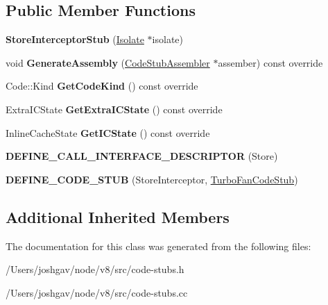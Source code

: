\subsection*{Public Member Functions}
\begin{DoxyCompactItemize}
\item 
{\bfseries Store\+Interceptor\+Stub} (\hyperlink{classv8_1_1internal_1_1_isolate}{Isolate} $\ast$isolate)\hypertarget{classv8_1_1internal_1_1_store_interceptor_stub_a30232ec1c8179667d06bca10ec6e38e6}{}\label{classv8_1_1internal_1_1_store_interceptor_stub_a30232ec1c8179667d06bca10ec6e38e6}

\item 
void {\bfseries Generate\+Assembly} (\hyperlink{classv8_1_1internal_1_1_code_stub_assembler}{Code\+Stub\+Assembler} $\ast$assember) const  override\hypertarget{classv8_1_1internal_1_1_store_interceptor_stub_a1ca7d83e7982122a236da19efa4c8324}{}\label{classv8_1_1internal_1_1_store_interceptor_stub_a1ca7d83e7982122a236da19efa4c8324}

\item 
Code\+::\+Kind {\bfseries Get\+Code\+Kind} () const  override\hypertarget{classv8_1_1internal_1_1_store_interceptor_stub_a625474bc6f95b0325d264dadd0e7e73a}{}\label{classv8_1_1internal_1_1_store_interceptor_stub_a625474bc6f95b0325d264dadd0e7e73a}

\item 
Extra\+I\+C\+State {\bfseries Get\+Extra\+I\+C\+State} () const  override\hypertarget{classv8_1_1internal_1_1_store_interceptor_stub_a4661a6b886a1020edaf3687632ae53e1}{}\label{classv8_1_1internal_1_1_store_interceptor_stub_a4661a6b886a1020edaf3687632ae53e1}

\item 
Inline\+Cache\+State {\bfseries Get\+I\+C\+State} () const  override\hypertarget{classv8_1_1internal_1_1_store_interceptor_stub_a2192a380e84da378575f87131162f47f}{}\label{classv8_1_1internal_1_1_store_interceptor_stub_a2192a380e84da378575f87131162f47f}

\item 
{\bfseries D\+E\+F\+I\+N\+E\+\_\+\+C\+A\+L\+L\+\_\+\+I\+N\+T\+E\+R\+F\+A\+C\+E\+\_\+\+D\+E\+S\+C\+R\+I\+P\+T\+OR} (Store)\hypertarget{classv8_1_1internal_1_1_store_interceptor_stub_afe129c2c92e43116250113d4b4037633}{}\label{classv8_1_1internal_1_1_store_interceptor_stub_afe129c2c92e43116250113d4b4037633}

\item 
{\bfseries D\+E\+F\+I\+N\+E\+\_\+\+C\+O\+D\+E\+\_\+\+S\+T\+UB} (Store\+Interceptor, \hyperlink{classv8_1_1internal_1_1_turbo_fan_code_stub}{Turbo\+Fan\+Code\+Stub})\hypertarget{classv8_1_1internal_1_1_store_interceptor_stub_a3e99e71972dd797ef019283062047cdd}{}\label{classv8_1_1internal_1_1_store_interceptor_stub_a3e99e71972dd797ef019283062047cdd}

\end{DoxyCompactItemize}
\subsection*{Additional Inherited Members}


The documentation for this class was generated from the following files\+:\begin{DoxyCompactItemize}
\item 
/\+Users/joshgav/node/v8/src/code-\/stubs.\+h\item 
/\+Users/joshgav/node/v8/src/code-\/stubs.\+cc\end{DoxyCompactItemize}
